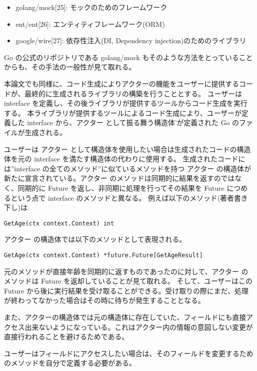 \begin{itemize}
\item
  golang/mock{[}25{]}: モックのためのフレームワーク
\item
  ent/ent{[}26{]}: エンティティフレームワーク(ORM)
\item
  google/wire{[}27{]}: 依存性注入(DI, Dependency
  injection)のためのライブラリ
\end{itemize}

Go の公式のリポジトリである golang/mock
もそのような方法をとっていることからも、その手法の一般性が見て取れる。

本論文でも同様に、コード生成によりアクターの機能をユーザーに提供するコードが、最終的に生成されるライブラリの構築を行うこととする。
ユーザーは interface
を定義し、その後ライブラリが提供するツールからコード生成を実行する。
本ライブラリが提供するツールによるコード生成により、ユーザーが定義した
interface から、アクター として振る舞う構造体'が定義された Go
のファイルが生成される。

ユーザーは アクター
として構造体を使用したい場合は生成されたコードの構造体を元の interface
を満たす構造体の代わりに使用する。 生成されたコードには''interface
の全てのメソッド''に似ているメソッドを持つ アクター
の構造体が新たに宣言されている。アクター
のメソッドは同期的に結果を返すのではなく、同期的に Future
を返し、非同期に処理を行ってその結果を Future につめるという点で
interface のメソッドと異なる。 例えば以下のメソッド(著者書き下し)は

\begin{verbatim}
GetAge(ctx context.Context) int
\end{verbatim}

アクター の構造体では以下のメソッドとして表現される。

\begin{verbatim}
GetAge(ctx context.Context) *future.Future[GetAgeResult]
\end{verbatim}

元のメソッドが直接年齢を同期的に返すものであったのに対して、アクター
のメソッドは Future を返却していることが見て取れる。
そして、ユーザーはこの Future
から後に実行結果を受け取ることができる。受け取りの際にまだ、処理が終わってなかった場合はその時に待ちが発生することとなる。

また、アクターの構造体では元の構造体に存在していた、フィールドにも直接アクセス出来ないようになっている。これはアクター内の情報の意図しない変更が直接行われることを避けるためである。

ユーザーはフィールドにアクセスしたい場合は、そのフィールドを変更するためのメソッドを自分で定義する必要がある。

